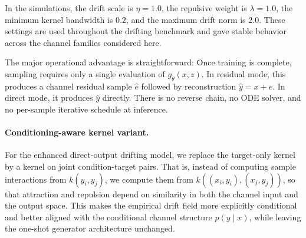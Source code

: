 \documentclass[conference]{IEEEtran}
\begin{document}
In the simulations, the drift scale is \(\eta=1.0\), the repulsive weight is \(\lambda=1.0\), the minimum kernel bandwidth is \(0.2\), and the maximum drift norm is \(2.0\).
These settings are used throughout the drifting benchmark and gave stable behavior across the channel families considered here.

The major operational advantage is straightforward:
Once training is complete, sampling requires only a single evaluation of \(g_\theta(x,z)\).
In residual mode, this produces a channel residual sample \(\hat e\) followed by reconstruction \(\hat y=x+\hat e\). In direct mode, it produces \(\hat y\) directly.
There is no reverse chain, no ODE solver, and no per-sample iterative schedule at inference.

\paragraph{Conditioning-aware kernel variant.}
For the enhanced direct-output drifting model, we replace the target-only kernel by a kernel on joint condition-target pairs. That is, instead of computing sample interactions from \(k(y_i,y_j)\), we compute them from \(k((x_i,y_i),(x_j,y_j))\), so that attraction and repulsion depend on similarity in both the channel input and the output space. This makes the empirical drift field more explicitly conditional and better aligned with the conditional channel structure \(p(y\mid x)\), while leaving the one-shot generator architecture unchanged.

%

%
\end{document}
